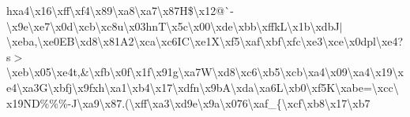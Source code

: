\begin{DoxyCompactItemize}
h{}xa4\textbackslash{}x16\textbackslash{}xff\textbackslash{}xf4\textbackslash{}x89\textbackslash{}xa8\textbackslash{}xa7\textbackslash{}x87\+H\$\textbackslash{}x12@\`{}-\/\textbackslash{}x9e\textbackslash{}xe7\textbackslash{}x0d\textbackslash{}xcb\textbackslash{}xc8u\textbackslash{}x03hn\+T\textbackslash{}x5c\textbackslash{}x00\textbackslash{}xde\textbackslash{}xbb\textbackslash{}xffk\+L\textbackslash{}x1b\textbackslash{}xdb\+J$\vert$\textbackslash{}xeba,\textbackslash{}xe0\+E\+B\textbackslash{}xd8\textbackslash{}x81\+A2\textbackslash{}xca\textbackslash{}xc6\+I\+C\textbackslash{}xe1\+X\textbackslash{}xf5\textbackslash{}xaf\textbackslash{}xbf\textbackslash{}xfc\textbackslash{}xe3\textbackslash{}xce\textbackslash{}x0dpl\textbackslash{}xe4?s$>$\textbackslash{}xeb\textbackslash{}x05\textbackslash{}xe4t,\&\textbackslash{}xfb\textbackslash{}x0f\textbackslash{}x1f\textbackslash{}x91g\textbackslash{}xa7\+W\textbackslash{}xd8\textbackslash{}xc6\textbackslash{}xb5\textbackslash{}xcb\textbackslash{}xa4\textbackslash{}x09\textbackslash{}xa4\textbackslash{}x19\textbackslash{}xe4\textbackslash{}xa3\+G\textbackslash{}xbfj\textbackslash{}x9fxh\textbackslash{}xa1\textbackslash{}xb4\textbackslash{}x17\textbackslash{}xdfn\textbackslash{}x9b\+A\textbackslash{}xda\textbackslash{}xa6\+L\textbackslash{}xb0\textbackslash{}xf5\+K\textbackslash{}xabe=\textbackslash{}xcc\textbackslash{}x19\+N\+D\%\%\%-\/\+J\textbackslash{}xa9\textquotesingle{}\textbackslash{}x87.(\textbackslash{}xff\textbackslash{}xa3\textbackslash{}xd9e\textbackslash{}x9a\textbackslash{}x076\textbackslash{}xaf\+\_\+\{\textbackslash{}xcf\textbackslash{}xb8\textbackslash{}x17\textbackslash{}xb7 
\end{DoxyCompactItemize}
